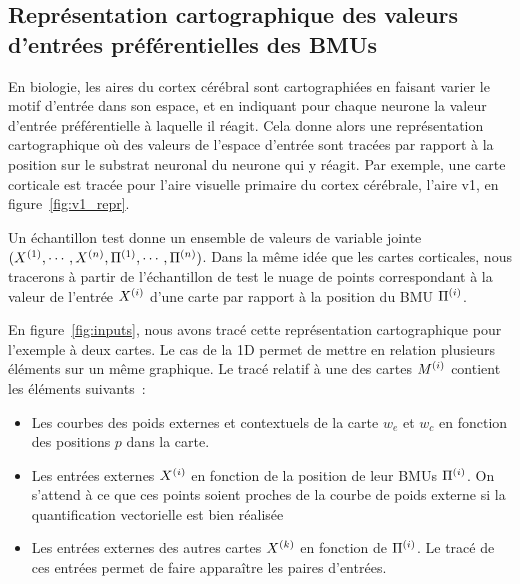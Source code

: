 \documentclass[../main]{subfiles}
\begin{document}
\subsection{Représentation cartographique des valeurs d'entrées préférentielles des BMUs}

En biologie, les aires du cortex cérébral sont cartographiées en faisant varier le motif d'entrée dans son espace, et en indiquant pour chaque neurone la valeur d'entrée préférentielle à laquelle il réagit. Cela donne alors une représentation cartographique où des valeurs de l'espace d'entrée sont tracées par rapport à la position sur le substrat neuronal du neurone qui y réagit.
Par exemple, une carte corticale est tracée pour l'aire visuelle primaire du cortex cérébrale, l'aire v1, en figure~\ref{fig:v1_repr}.

Un échantillon test donne un ensemble de valeurs de variable jointe $(X^{({1})}, \cdots, X^{({n})}, \Pi^{({1})},\cdots, \Pi^{({n})})$. Dans la même idée que les cartes corticales, nous tracerons à partir de l'échantillon de test le nuage de points correspondant à la valeur de l'entrée $X^{({i})}$ d'une carte par rapport à la position du BMU $\Pi^{({i})}$.

En figure~\ref{fig:inputs}, nous avons tracé cette représentation cartographique pour l'exemple à deux cartes. Le cas de la 1D permet de mettre en relation plusieurs éléments sur un même graphique.
Le tracé relatif à une des cartes $M^{({i})}$ contient les éléments suivants~:
\begin{itemize}
    \item Les courbes des poids externes et contextuels de la carte $w_e$ et $w_c$ en fonction des positions $p$ dans la carte.
    \item Les entrées externes $X^{({i})}$ en fonction de la position de leur BMUs $\Pi^{({i})}$. On s'attend à ce que ces points soient proches de la courbe de poids externe si la quantification vectorielle est bien réalisée
    \item Les entrées externes des autres cartes $X^{({k})}$ en fonction de $\Pi^{({i})}$. Le tracé de ces entrées permet de faire apparaître les paires d'entrées.
\end{itemize} 
\end{document}
